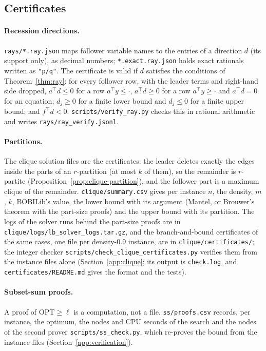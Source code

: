 \subsection{Certificates}

\paragraph{Recession directions.} \texttt{rays/*.ray.json} maps follower
variable names to the entries of a direction $d$ (its support only), as
decimal numbers; \texttt{*.exact.ray.json} holds exact rationals written as
\texttt{"p/q"}. The certificate is valid if $d$ satisfies the conditions of
Theorem~\ref{thm:ray}: for every follower row, with the leader terms and
right-hand side dropped, $a^{\top}d\le 0$ for a row $a^{\top}y\le\cdot$,
$a^{\top}d\ge 0$ for a row $a^{\top}y\ge\cdot$ and $a^{\top}d=0$ for an
equation; $d_j\ge 0$ for a finite lower bound and $d_j\le 0$ for a finite upper
bound; and $f^{\top}d<0$. \texttt{scripts/verify\_ray.py} checks this in rational
arithmetic and writes \texttt{rays/ray\_verify.jsonl}.

\paragraph{Partitions.} The clique solution files are the certificates: the
leader deletes exactly the edges inside the parts of an $r$-partition (at most
$k$ of them), so the remainder is $r$-partite
(Proposition~\ref{prop:clique-partition}), and the follower part is a maximum
clique of the remainder. \texttt{clique/summary.csv} gives per instance $n$, the
density, $m$, $k$, BOBILib's value, the lower bound with its argument (Mantel,
or Brouwer's theorem with the part-size proofs) and the upper bound with its
partition. The logs of the solver runs behind the \NumCliquePartCases{}
part-size proofs are in \texttt{clique/logs/lb\_solver\_logs.tar.gz}, and the
branch-and-bound certificates of the same cases, one file per density-0.9
instance, are in \texttt{clique/certificates/}; the integer checker
\texttt{scripts/check\_clique\_certificates.py} verifies them from the instance
files alone (Section~\ref{app:clique}; its output is \texttt{check.log}, and
\texttt{certificates/README.md} gives the format and the tests).

\paragraph{Subset-sum proofs.} A proof of $\mathrm{OPT}\ge\ell$ is a
computation, not a file. \texttt{ss/proofs.csv} records, per instance, the
optimum, the nodes and CPU seconds of the search and the nodes of the
second prover \texttt{scripts/ss\_check.py}, which re-proves the bound
from the instance files (Section~\ref{app:verification}).

